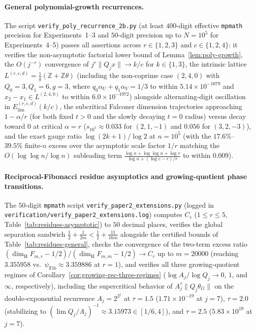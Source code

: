 \documentclass[11pt]{article}
\theoremstyle{definition}
\theoremstyle{remark}
\newcommand{\Z}{\mathbb{Z}}
\newcommand{\dimH}{\dim_{\mathrm{H}}}
\begin{document}
\paragraph{General polynomial-growth recurrences.} The script
\texttt{verify\_\allowbreak poly\_\allowbreak recurrence\_\allowbreak 2b.py}
(at least $400$-digit effective \texttt{mpmath} precision for Experiments~1--3
and $50$-digit precision up to $N=10^5$ for Experiments~4--5) passes all
assertions across $r\in\{1,2,3\}$ and $c\in\{1,2,4\}$: it verifies the
non-asymptotic factorial lower bound of Lemma~\ref{lem:poly-growth}, the
$O(j^{-r})$ convergence of $j^r\|Q_jx\|\to k/c$ for $k\in\{1,3\}$, the
intrinsic lattice $L^{(r,c,d)}=\frac{1}{g}(\Z+\Z\theta)$ (including the
non-coprime case $(2,4,0)$ with $Q_0=3,Q_1=6,g=3$, where
$q_0\alpha_U+q_1\alpha_V=1/3$ to within $5.14\times10^{-1079}$ and $x_2-x_1\in
L^{(2,4,0)}$ to within $6.0\times10^{-1072}$) alongside alternating-digit
oscillation in $E_{\mathrm{lim}}^{(r,c,d)}(k/c)$, the subcritical Falconer
dimension trajectories approaching $1-\alpha/r$ (for both fixed $t>0$ and the
slowly decaying $t=0$ radius) versus decay toward $0$ at critical $\alpha=r$
($s_{10^5}\approx0.033$ for $(2,1,-1)$ and $0.056$ for $(3,2,-3)$), and the
exact gauge ratio $\log(2k+1)/\log2$ at $n=10^5$ (with the $17.6\%$--$39.5\%$
finite-$n$ excess over the asymptotic scale factor $1/r$ matching the
$O(\log\log n/\log n)$ subleading term $\frac{\log n+\log\log n+\log r}{\log n+(\log c-r)/r}$
to within $0.009$).

\paragraph{Reciprocal-Fibonacci residue asymptotics and growing-quotient phase transitions.}
The $50$-digit \texttt{mpmath} script
\texttt{verify\_\allowbreak paper2\_\allowbreak extensions.py} (logged in
\texttt{verification/\allowbreak verify\_\allowbreak paper2\_\allowbreak extensions.log})
computes $C_r$ ($1\le r\le 5$, Table~\ref{tab:residues-asymptotic}) to $50$ decimal
places, verifies the global separation sandwich
$\frac12+\frac{1}{2m}<\frac12+\frac{11}{16m}$ alongside the certified bounds of
Table~\ref{tab:residues-general}, checks the convergence of the two-term
excess ratio $(\dimH F_{m,r}-1/2)/(\dimH F_{m,m}-1/2)\to C_r$ up to $m=20000$
(reaching $3.355958$ vs.\ $\psi_{\mathrm{Fib}}\approx3.359886$ at $r=1$), and
verifies all three growing-quotient regimes of
Corollary~\ref{cor:growing-rec-three-regimes} ($\log A_j/\log Q_j\to 0$, $1$,
and $\infty$, respectively), including the supercritical behavior of
$A_j^\tau\|Q_j\theta_G\|$ on the double-exponential recurrence $A_j=2^{2^j}$ at
$\tau=1.5$ ($1.71\times10^{-19}$ at $j=7$), $\tau=2.0$ (stabilizing to
$(\lim Q_j/A_j)^{-1}\approx 3.15973\in[1/6,4]$), and $\tau=2.5$
($5.83\times10^{19}$ at $j=7$).
\end{document}
